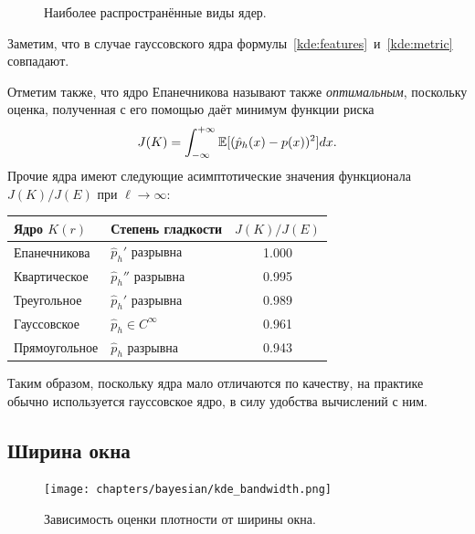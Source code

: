 {\begin{figure}[h]
\caption{Наиболее распространённые виды ядер.}\label{kde:kernels}
\end{figure}

Заметим, что в случае гауссовского ядра
формулы~\eqref{kde:features}~и~\eqref{kde:metric} совпадают.

Отметим также, что ядро Епанечникова называют также \emph{оптимальным},
поскольку оценка, полученная с его помощью даёт минимум функции риска
\[
J(K) = \int_{-\infty}^{+\infty} \mathbb{E}[ (\hat{p}_h(x) - p(x))^2 ] dx.
\]
Прочие ядра имеют следующие асимптотические значения функционала $J(K)/J(E)$ при
$\ell \to \infty$:
\begin{center}
\begin{tabular}{|l|l|c|}
\hline
\textbf{Ядро} $K(r)$ & \textbf{Степень гладкости} & $J(K)/J(E)$ \\
\hline
Епанечникова & $\hat{p}_h'$ разрывна & 1.000\\
Квартическое & $\hat{p}_h''$ разрывна & 0.995\\
Треугольное & $\hat{p}_h'$ разрывна & 0.989\\
Гауссовское & $\hat{p}_h\in C^\infty$ & 0.961\\
Прямоугольное & $\hat{p}_h$ разрывна & 0.943\\
\hline
\end{tabular}
\end{center}
Таким образом, поскольку ядра мало отличаются по качеству, на практике обычно
используется гауссовское ядро, в силу удобства вычислений с ним.

\subsection*{Ширина окна}
\begin{figure}
\texttt{[image: chapters/bayesian/kde\_bandwidth.png]}
\caption{Зависимость оценки плотности от ширины окна.}\label{kde:bandwidth}
\end{figure}

}
